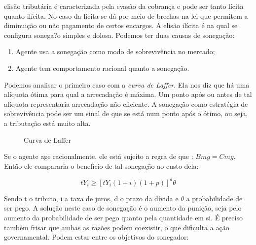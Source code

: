\documentclass[12pt,a4paper,oneside,brazil]{abntex2}
\begin{document}
 elisão tributária é caracterizada pela evasão da cobrança e pode ser tanto lícita quanto ilícita. No caso da lícita se dá por meio de brechas na lei que permitem a diminuição ou não pagamento de certos encargos. A elisão ilícita é na qual se configura sonega?o simples e dolosa. Podemos ter duas causas de sonegação:
\begin{enumerate}
	\item Agente usa a sonegação como modo de sobrevivência no mercado;
	\item Agente tem comportamento racional quanto a sonegação.
\end{enumerate}

Podemos analisar o primeiro caso com a \emph{curva de Laffer}. Ela nos diz que há uma alíquota ótima para qual a arrecadação é máxima. Um ponto após ou antes de tal alíquota representaria arrecadação não eficiente. A sonegação como estratégia de sobrevivência pode ser um sinal de que se está num ponto após o ótimo, ou seja, a tributação está muito alta. 

\begin{figure}
	\centering
	\caption{Curva de Laffer}
	\end{figure}

Se o agente age racionalmente, ele está sujeito a regra de que : $Bmg = Cmg$. Então ele compararia o benefício de tal sonegação ao custo dela:

\begin{equation} \label{sonegar}
 t Y_i \geq [t Y_i (1 + i) (1 + p) ]^d \theta
\end{equation}

Sendo t o tributo, i a taxa de juros, d o prazo da dívida e $\theta$ a probabilidade de ser pego. A solução neste caso de sonegação é o aumento da punição, seja pelo aumento da probabilidade de ser pego quanto pela quantidade em si. É preciso também frisar que ambas as razões podem coexistir, o que dificulta a ação governamental. Podem estar entre os objetivos do sonegador:
\end{document}
